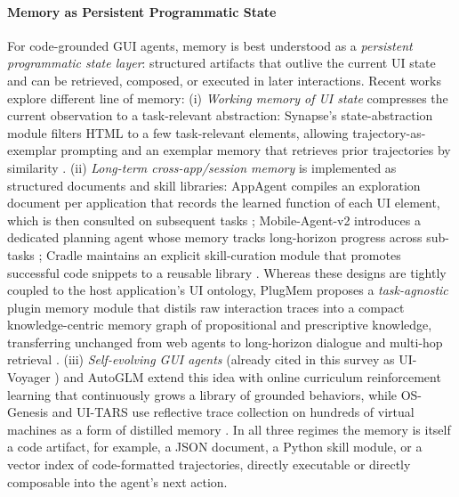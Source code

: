 \paragraph{Memory as Persistent Programmatic State}
For code-grounded GUI agents, memory is best understood as a \textit{persistent programmatic state layer}: structured artifacts that outlive the current UI state and can be retrieved, composed, or executed in later interactions. Recent works explore different line of memory: (i) \textit{Working memory of UI state} compresses the current observation to a task-relevant abstraction: Synapse's state-abstraction module filters HTML to a few task-relevant elements, allowing trajectory-as-exemplar prompting and an exemplar memory that retrieves prior trajectories by similarity \citep{zheng2024synapsetrajectoryasexemplarpromptingmemory}. (ii) \textit{Long-term cross-app/session memory} is implemented as structured documents and skill libraries: AppAgent compiles an exploration document per application that records the learned function of each UI element, which is then consulted on subsequent tasks \citep{zhang2023appagentmultimodalagentssmartphone}; Mobile-Agent-v2 introduces a dedicated planning agent whose memory tracks long-horizon progress across sub-tasks \citep{wang2024mobileagentv2mobiledeviceoperation}; Cradle maintains an explicit skill-curation module that promotes successful code snippets to a reusable library \citep{tan2024cradleempoweringfoundationagents}. Whereas these designs are tightly coupled to the host application's UI ontology, PlugMem proposes a \textit{task-agnostic} plugin memory module that distils raw interaction traces into a compact knowledge-centric memory graph of propositional and prescriptive knowledge, transferring unchanged from web agents to long-horizon dialogue and multi-hop retrieval \citep{yang2026plugmemtaskagnosticpluginmemory}. (iii) \textit{Self-evolving GUI agents} (already cited in this survey as UI-Voyager \citep{lin2026uivoyagerselfevolvingguiagent}) and AutoGLM extend this idea with online curriculum reinforcement learning that continuously grows a library of grounded behaviors, while OS-Genesis and UI-TARS use reflective trace collection on hundreds of virtual machines as a form of distilled memory \citep{liu2024autoglmautonomousfoundationagents,sun2025osgenesisautomatingguiagent,qin2025uitarspioneeringautomatedgui}. In all three regimes the memory is itself a code artifact, for example, a JSON document, a Python skill module, or a vector index of code-formatted trajectories, directly executable or directly composable into the agent's next action.

